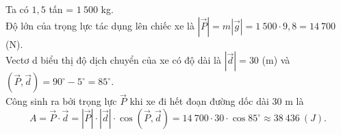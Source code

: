 \begin{vd}
{\begin{center}
		\end{center}
		\noindent 
		Ta có $1{,}5$ tấn = $1~500$ kg.\\
		Độ lớn của trọng lực tác dụng lên chiếc xe là $\left|\vec{P}\right| = m \left|\vec{g}\right| = 1~500\cdot 9{,}8 = 14~700$ (N).\\
		Vectơ d biểu thị độ dịch chuyển của xe có độ dài là $\left|\vec{d}\right| = 30$ (m) và $ \left(\vec{P},\vec{d}\right)= 90^\circ - 5^\circ = 85^\circ$.\\
		Công sinh ra bởi trọng lực $\vec{P}$ khi xe đi hết đoạn đường dốc dài $30$ m là
		$$A=\vec{P}\cdot\vec{d}=\left|\vec{P}\right|\cdot\left|\vec{d}\right|\cdot\cos\left(\vec{P},\vec{d}\right) = 14~700\cdot 30\cdot \cos 85^\circ \approx 38~436~(J).$$
	}
\end{vd}
